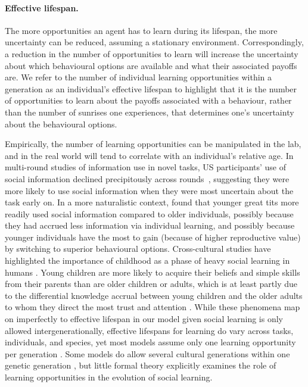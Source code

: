 \documentclass[letterpaper,11.5pt]{scrartcl}
\begin{document}
\paragraph{Effective lifespan.} The more opportunities an agent has to learn during its lifespan, the more uncertainty can be reduced, assuming a stationary environment. Correspondingly, a reduction in the number of opportunities to learn will increase the uncertainty about which behavioural options are available and what their associated
payoffs are. %
We refer to the number of individual learning opportunities within a generation as an individual's effective lifespan to highlight that it is the number of opportunities to learn about the payoffs associated with a behaviour, rather than the number of sunrises one experiences, that determines one's uncertainty about the behavioural options.  

Empirically, the number of learning opportunities can be manipulated in the lab, and in the real world will tend to correlate with an individual's relative age. In multi-round studies of information use in novel tasks, US participants' use of social
information declined precipitously across rounds~\citep{McElreath2005}, suggesting
they were more likely to use social information when they were most uncertain about the task early on. In a more naturalistic context, \citet{Aplin2017} found that younger great tits more readily used social information compared to older individuals, possibly because they had accrued less information via individual learning, and possibly because younger individuals have the most to gain (because of higher reproductive value) by switching to superior behavioural options. Cross-cultural studies have highlighted the importance of childhood as a phase of heavy social learning in humans \citep{Reyes2016}. Young children are more likely to
acquire their beliefs and simple skills from their parents than are older children
or adults, which is at least partly due to the differential knowledge accrual
between young children and the older adults to whom they direct the most trust and
attention \citep{kline2013teaching}. While these phenomena map on imperfectly to effective lifespan in our model given social learning is only allowed intergenerationally, effective lifespans for learning do vary across tasks, individuals, and species, yet most models assume only one learning opportunity per generation \citep{BoydRicherson1985, Feldman1996,Henrich1998, perreault2012bayesian}. Some models do allow several cultural generations within one genetic generation \citep{Enquist2007,Rendell2010,lindstrom2016co}, but little formal theory explicitly examines the role of learning opportunities in the evolution of social learning. 
\end{document}

